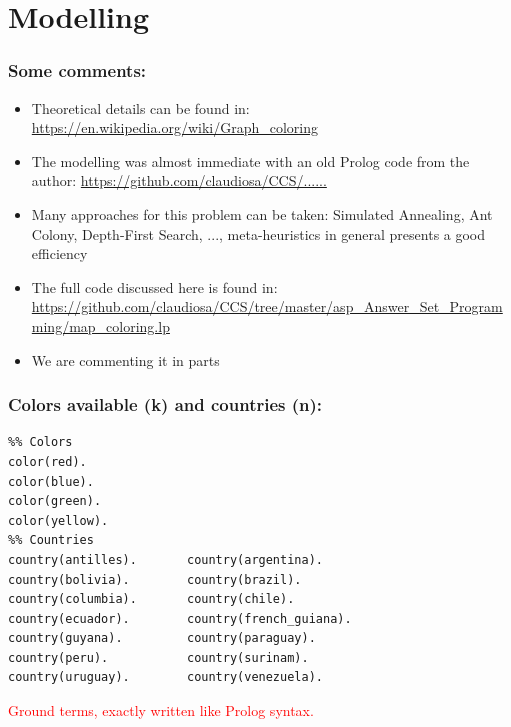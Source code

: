 \documentclass{beamer}
\begin{document}
\section{Modelling}
\begin{frame}[fragile] 
	\frametitle{Some comments:}
	
\begin{block}{}
  \begin{itemize}
 \item Theoretical details can be found in: \url{https://en.wikipedia.org/wiki/Graph_coloring}

 \item The modelling was almost immediate with an old Prolog code from the author:
\url{https://github.com/claudiosa/CCS/......}

  \item Many approaches for this problem can be taken: Simulated Annealing, Ant Colony, Depth-First Search, ..., meta-heuristics in general presents a good efficiency
  \item The full code discussed here is found in:\\ \url{https://github.com/claudiosa/CCS/tree/master/asp_Answer_Set_Programming/map_coloring.lp}
  \item We are commenting it in parts

   \end{itemize}
 \end{block}
	
	
\end{frame}
\begin{frame}[fragile] 
\frametitle{Colors available (k) and countries (n):}
	
{\small
\begin{verbatim}
%% Colors
color(red).
color(blue).
color(green).
color(yellow).
%% Countries
country(antilles).       country(argentina).
country(bolivia).        country(brazil).
country(columbia).       country(chile).
country(ecuador).        country(french_guiana).
country(guyana).         country(paraguay).
country(peru).           country(surinam).
country(uruguay).        country(venezuela).

\end{verbatim}
}	
\textcolor{red}{Ground terms, exactly written like Prolog syntax.}
\end{frame}


\end{document}
